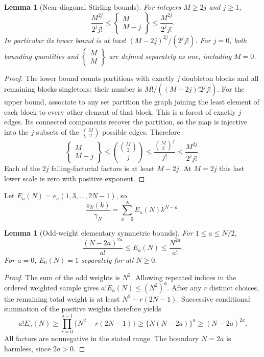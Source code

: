 \documentclass[11pt,letterpaper]{article}
\newtheorem{lemma}[theorem]{Lemma}
\theoremstyle{remark}\newtheorem{remark}[theorem]{Remark}
\newcommand{\fall}[2]{#1^{\underline{#2}}}
\newcommand{\stir}[2]{\left\{\begin{matrix}#1\\#2\end{matrix}\right\}}
\begin{document}
\begin{lemma}[Near-diagonal Stirling bounds]\label{wdn:edge:lem:stirling}
For integers $M\ge2j$ and $j\ge1$,
\begin{equation}\label{wdn:edge:eq:stirling}
 \frac{\fall M{2j}}{2^j j!}
 \le\stir M{M-j}\le\frac{M^{2j}}{2^j j!}.
\end{equation}
In particular its lower bound is at least
$(M-2j)^{2j}/(2^j j!)$. For $j=0$, both bounding quantities and
$\stir MM$ are defined separately as one, including $M=0$.
\end{lemma}
\begin{proof}
The lower bound counts partitions with exactly $j$ doubleton blocks and
all remaining blocks singletons; their number is
$M!/((M-2j)!2^j j!)$.
For the upper bound, associate to any set partition the graph joining
the least element of each block to every other element of that block.
This is a forest of exactly $j$ edges. Its connected components recover
the partition, so the map is injective into the $j$-subsets of the
$\binom M2$ possible edges. Therefore
\[
 \stir M{M-j}\le\binom{\binom M2}{j}
 \le\frac{\binom M2^j}{j!}\le\frac{M^{2j}}{2^j j!}.
\]
Each of the $2j$ falling-factorial factors is at least $M-2j$.
At $M=2j$ this last lower scale is zero with positive exponent.
\end{proof}

Let $E_a(N)=e_a(1,3,\ldots,2N-1)$, so
\begin{equation}\label{wdn:edge:eq:Edef}
 \frac{z_N(k)}{\gamma_N}=\sum_{a=0}^{N}E_a(N)k^{N-a}.
\end{equation}
\begin{lemma}[Odd-weight elementary symmetric bounds]\label{wdn:edge:lem:E}
For $1\le a\le N/2$,
\begin{equation}\label{wdn:edge:eq:Ebounds}
 \frac{(N-2a)^{2a}}{a!}\le E_a(N)\le\frac{N^{2a}}{a!}.
\end{equation}
For $a=0$, $E_0(N)=1$ separately for all $N\ge0$.
\end{lemma}
\begin{proof}
The sum of the odd weights is $N^2$. Allowing repeated indices in the
ordered weighted sample gives $a!E_a(N)\le(N^2)^a$.
After any $r$ distinct choices, the remaining total weight is at least
$N^2-r(2N-1)$. Successive conditional summation of the positive weights
therefore yields
\begin{equation}\label{wdn:edge:eq:Eproduct}
 a!E_a(N)\ge\prod_{r=0}^{a-1}\{N^2-r(2N-1)\}
 \ge\{N(N-2a)\}^a\ge(N-2a)^{2a}.
\end{equation}
All factors are nonnegative in the stated range. The boundary $N=2a$
is harmless, since $2a>0$.
\end{proof}
\end{document}
